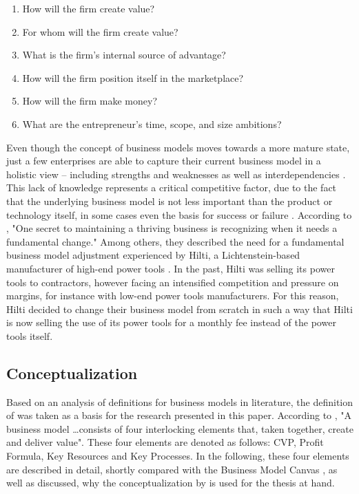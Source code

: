 \begin{enumerate}
	\item How will the firm create value?
	\item For whom will the firm create value?
	\item What is the firm's internal source of advantage?
	\item How will the firm position itself in the marketplace?
	\item How will the firm make money?
	\item What are the entrepreneur's time, scope, and size ambitions?
\end{enumerate}

Even though the concept of business models moves towards a more mature state, just a few enterprises are able to capture their current business model in a holistic view -- including strengths and weaknesses as well as interdependencies \citep[p. 52]{Johnson2008}. This lack of knowledge represents a critical competitive factor, due to the fact that the underlying business model is not less important than the product or technology itself, in some cases even the basis for success or failure . According to \citet[p. 50]{Johnson2008}, "One secret to maintaining a thriving business is recognizing when it needs a fundamental change." Among others, they described the need for a fundamental business model adjustment experienced by Hilti, a Lichtenstein-based manufacturer of high-end power tools \citep[pp. 54-57]{Johnson2008}. In the past, Hilti was selling its power tools to contractors, however facing an intensified competition and pressure on margins, for instance with low-end power tools manufacturers. For this reason, Hilti decided to change their business model from scratch in such a way that Hilti is now selling the use of its power tools for a monthly fee instead of the power tools itself.

\subsection{Conceptualization}\label{ch:sota:bmc}

Based on an analysis of definitions for business models in literature, the definition of \citet{Johnson2008} was taken as a basis for the research presented in this paper. According to \citet[p. 52]{Johnson2008}, "A business model \ldots consists of four interlocking elements that, taken together, create and deliver value". These four elements are denoted as follows: \ac{CVP}, Profit Formula, Key Resources and Key Processes. In the following, these four elements are described in detail, shortly compared with the Business Model Canvas \citep{Osterwalder2010}, as well as discussed, why the conceptualization by \citet{Johnson2008} is used for the thesis at hand.

